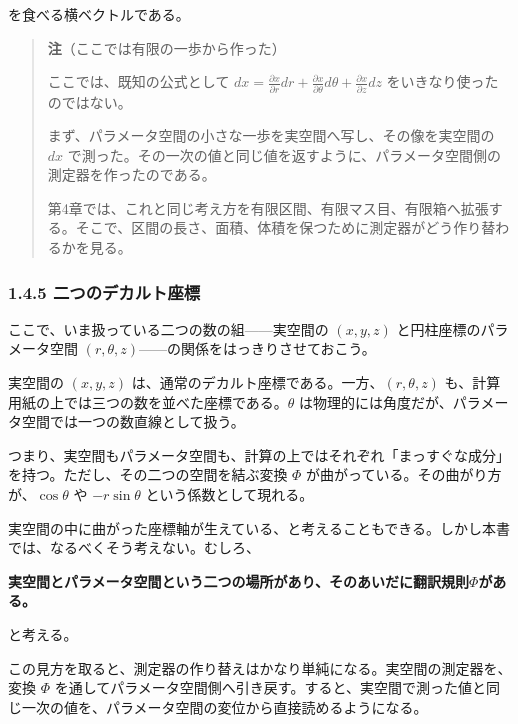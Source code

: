 \documentclass[a4paper,12pt,openany]{book}
\begin{document}
を食べる横ベクトルである。

\begin{quote}
\textbf{注}（ここでは有限の一歩から作った）

ここでは、既知の公式として
\(dx=\frac{\partial x}{\partial r}dr+\frac{\partial x}{\partial\theta}d\theta+\frac{\partial x}{\partial z}dz\)
をいきなり使ったのではない。

まず、パラメータ空間の小さな一歩を実空間へ写し、その像を実空間の \(dx\)
で測った。その一次の値と同じ値を返すように、パラメータ空間側の測定器を作ったのである。

第4章では、これと同じ考え方を有限区間、有限マス目、有限箱へ拡張する。そこで、区間の長さ、面積、体積を保つために測定器がどう作り替わるかを見る。
\end{quote}

\hypertarget{ux4e8cux3064ux306eux30c7ux30abux30ebux30c8ux5ea7ux6a19}{%
\subsubsection{1.4.5
二つのデカルト座標}\label{ux4e8cux3064ux306eux30c7ux30abux30ebux30c8ux5ea7ux6a19}}

ここで、いま扱っている二つの数の組——実空間の \((x,y,z)\)
と円柱座標のパラメータ空間
\((r,\theta,z)\)——の関係をはっきりさせておこう。

実空間の \((x,y,z)\)
は、通常のデカルト座標である。一方、\((r,\theta,z)\)
も、計算用紙の上では三つの数を並べた座標である。\(\theta\)
は物理的には角度だが、パラメータ空間では一つの数直線として扱う。

つまり、実空間もパラメータ空間も、計算の上ではそれぞれ「まっすぐな成分」を持つ。ただし、その二つの空間を結ぶ変換
\(\Phi\) が曲がっている。その曲がり方が、\(\cos\theta\) や
\(-r\sin\theta\) という係数として現れる。

実空間の中に曲がった座標軸が生えている、と考えることもできる。しかし本書では、なるべくそう考えない。むしろ、

\textbf{実空間とパラメータ空間という二つの場所があり、そのあいだに翻訳規則}\(\Phi\)\textbf{がある。}

と考える。

この見方を取ると、測定器の作り替えはかなり単純になる。実空間の測定器を、変換
\(\Phi\)
を通してパラメータ空間側へ引き戻す。すると、実空間で測った値と同じ一次の値を、パラメータ空間の変位から直接読めるようになる。
\end{document}
